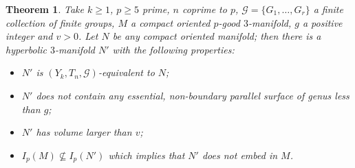 \documentclass[10pt,a4paper]{amsart}
\newtheorem{thm}{Theorem}
\begin{document}
\begin{thm}\label{thm:main}
	Take $k\geq 1$, $p\geq 5$ prime, $n$ coprime to $p$, $\mathcal{G}=\{G_1,\dots, G_r\}$ a finite collection of finite groups, $M$ a compact oriented $p$-good $3$-manifold, $g$ a positive integer and $v>0$. Let $N$ be any compact oriented manifold; then there is a hyperbolic $3$-manifold $N'$ with the following properties:
	
	\begin{itemize}
		\item  $N'$ is $(Y_k,T_n,\mathcal{G})$-equivalent to $N$;
		\item $N'$ does not contain any essential, non-boundary parallel surface of genus less than $g$;
		\item $N'$ has volume larger than $v$;
		\item $I_p(M)\nsubseteq I_p(N')$ which implies that $N'$ does not embed in $M$.
	\end{itemize}
\end{thm}
\end{document}
